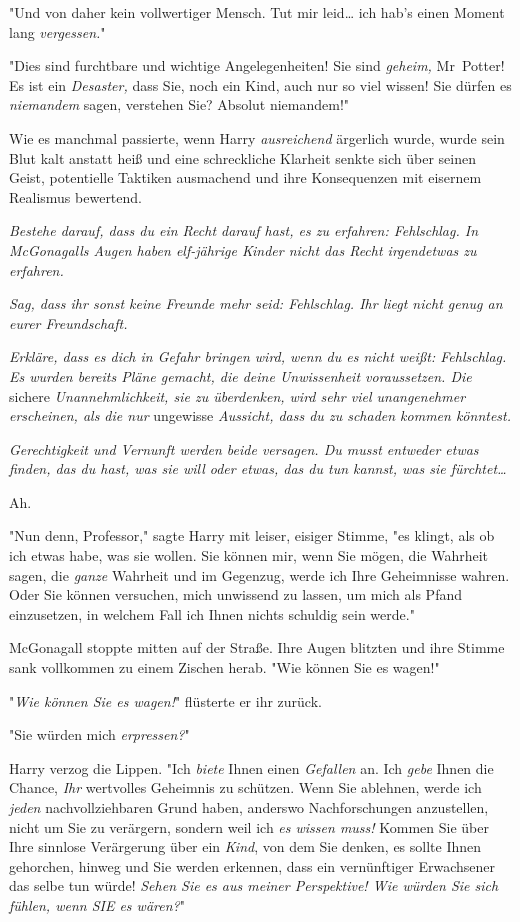 {"Und von daher kein vollwertiger Mensch. Tut mir leid… ich hab's einen Moment lang \emph{vergessen.}"

"Dies sind furchtbare und wichtige Angelegenheiten! Sie sind \emph{geheim,} Mr~Potter! Es ist ein \emph{Desaster,} dass Sie, noch ein Kind, auch nur so viel wissen! Sie dürfen es \emph{niemandem} sagen, verstehen Sie? Absolut niemandem!"

Wie es manchmal passierte, wenn Harry \emph{ausreichend} ärgerlich wurde, wurde sein Blut kalt anstatt heiß und eine schreckliche Klarheit senkte sich über seinen Geist, potentielle Taktiken ausmachend und ihre Konsequenzen mit eisernem Realismus bewertend.

\emph{Bestehe darauf, dass du ein Recht darauf hast, es zu erfahren: Fehlschlag. In McGonagalls Augen haben elf-jährige Kinder nicht das Recht irgendetwas zu erfahren.}

\emph{Sag, dass ihr sonst keine Freunde mehr seid: Fehlschlag. Ihr liegt nicht genug an eurer Freundschaft.}

\emph{Erkläre, dass es dich in Gefahr bringen wird, wenn du es nicht weißt: Fehlschlag. Es wurden bereits Pläne gemacht, die deine Unwissenheit voraussetzen. Die} sichere \emph{Unannehmlichkeit, sie zu überdenken, wird sehr viel unangenehmer erscheinen, als die nur} ungewisse \emph{Aussicht, dass du zu schaden kommen könntest.}

\emph{Gerechtigkeit und Vernunft werden beide versagen. Du musst entweder etwas finden, das du hast, was sie will oder etwas, das du tun kannst, was sie fürchtet…}

Ah.

"Nun denn, Professor," sagte Harry mit leiser, eisiger Stimme, "es klingt, als ob ich etwas habe, was sie wollen. Sie können mir, wenn Sie mögen, die Wahrheit sagen, die \emph{ganze} Wahrheit und im Gegenzug, werde ich Ihre Geheimnisse wahren. Oder Sie können versuchen, mich unwissend zu lassen, um mich als Pfand einzusetzen, in welchem Fall ich Ihnen nichts schuldig sein werde."

McGonagall stoppte mitten auf der Straße. Ihre Augen blitzten und ihre Stimme sank vollkommen zu einem Zischen herab. "Wie können Sie es wagen!"

"\emph{Wie können Sie es wagen!}" flüsterte er ihr zurück.

"Sie würden mich \emph{erpressen?}"

Harry verzog die Lippen. "Ich \emph{biete} Ihnen einen \emph{Gefallen} an. Ich \emph{gebe} Ihnen die Chance, \emph{Ihr} wertvolles Geheimnis zu schützen. Wenn Sie ablehnen, werde ich \emph{jeden} nachvollziehbaren Grund haben, anderswo Nachforschungen anzustellen, nicht um Sie zu verärgern, sondern weil ich \emph{es wissen muss!} Kommen Sie über Ihre sinnlose Verärgerung über ein \emph{Kind}, von dem Sie denken, es sollte Ihnen gehorchen, hinweg und Sie werden erkennen, dass ein vernünftiger Erwachsener das selbe tun würde! \emph{Sehen Sie es aus meiner Perspektive! Wie würden Sie sich fühlen, wenn SIE es wären?}"

}
